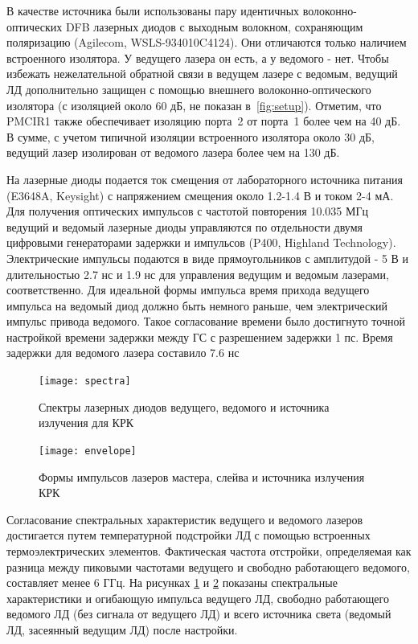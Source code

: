 В качестве источника были использованы пару идентичных волоконно-оптических DFB лазерных диодов с выходным волокном, сохраняющим поляризацию (Agilecom, WSLS-934010C4124). Они отличаются только наличием встроенного изолятора. У ведущего лазера он есть, а у ведомого - нет. Чтобы избежать нежелательной обратной связи в ведущем лазере с ведомым, ведущий ЛД дополнительно защищен с помощью внешнего волоконно-оптического изолятора (с изоляцией около 60 дБ, не показан в~\cref{fig:setup}). Отметим, что PMCIR1 также обеспечивает изоляцию порта~2 от порта~1 более чем на 40 дБ. В сумме, с учетом типичной изоляции встроенного изолятора около 30 дБ, ведущий лазер изолирован от ведомого лазера более чем на 130 дБ.
 
На лазерные диоды подается ток смещения от лабораторного источника питания (E3648A, Keysight) с напряжением смещения около 1.2-1.4 В и током 2-4 мА. Для получения оптических импульсов с частотой повторения 10.035 МГц ведущий и ведомый лазерные диоды управляются по отдельности двумя цифровыми генераторами задержки и импульсов (P400, Highland Technology). Электрические импульсы подаются в виде прямоугольников с амплитудой - 5 В и длительностью 2.7 нс и 1.9 нс для управления ведущим и ведомым лазерами, соответственно. Для идеальной формы импульса время прихода ведущего импульса на ведомый диод должно быть немного раньше, чем электрический импульс привода ведомого. Такое согласование времени было достигнуто точной настройкой времени задержки между ГС с разрешением задержки 1 пс. Время задержки для ведомого лазера составило 7.6 нс
\begin{figure}
	\centering
	\texttt{[image: spectra]}
	\caption{Спектры лазерных диодов ведущего, ведомого и источника излучения для КРК}
	\label{fig:QKD_source_spectra}
\end{figure}

\begin{figure}
	\centering
	\texttt{[image: envelope]}
	\caption{Формы импульсов лазеров мастера, слейва и источника излучения КРК}
	\label{fig:QKD_source_pulse}
\end{figure}

Согласование спектральных характеристик ведущего и ведомого лазеров достигается путем температурной подстройки ЛД с помощью встроенных термоэлектрических элементов. Фактическая частота отстройки, определяемая как разница между пиковыми частотами ведущего и свободно работающего ведомого, составляет менее 6 ГГц. На рисунках \ref{fig:QKD_source_spectra} и \ref{fig:QKD_source_pulse} показаны спектральные характеристики и огибающую импульса ведущего ЛД, свободно работающего ведомого ЛД (без сигнала от ведущего ЛД) и всего источника света (ведомый ЛД, засеянный ведущим ЛД) после настройки. 

